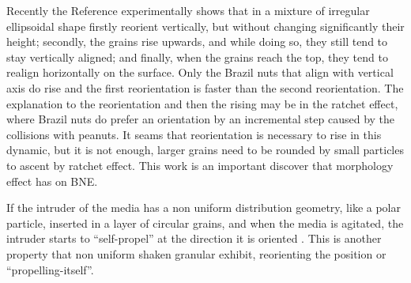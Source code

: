     Recently the Reference \cite{Size_segregation_of_irregular_granular_materials_captured_by_time-resolved_3D_imaging} experimentally shows that in a mixture of irregular ellipsoidal shape firstly reorient vertically, but without changing significantly their height; secondly, the grains rise upwards, and while doing so, they still tend to stay vertically aligned; and finally, when the grains reach the top, they tend to realign horizontally on the surface. Only the Brazil nuts that align with vertical axis do rise and the first reorientation is faster than the second reorientation. The explanation to the reorientation and then the rising may be in the ratchet effect, where Brazil nuts do prefer an orientation by an incremental step caused by the collisions with peanuts. It seams that reorientation is necessary to rise in this dynamic, but it is not enough, larger grains need to be rounded by small particles to ascent by ratchet effect. This work is an important discover that morphology effect has on BNE.

    If the intruder of the media has a non uniform distribution geometry, like a polar particle, inserted in a layer of circular grains, and when the media is agitated, the intruder starts to ``self-propel'' at the direction it is oriented \cite{Symmetry_properties_of_the_large-deviation_function_of_the_velocity_of_a_self-propelled_polar_particle}. This is another property that non uniform shaken granular exhibit, reorienting the position or ``propelling-itself''. 


